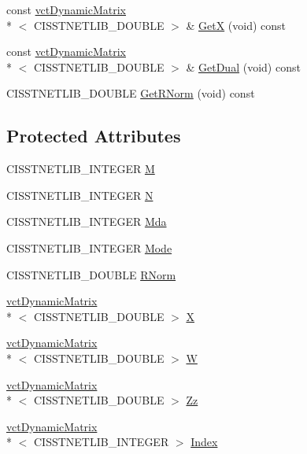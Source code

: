 \begin{DoxyCompactItemize}
\item 
const \hyperlink{classvct_dynamic_matrix}{vct\-Dynamic\-Matrix}\\*
$<$ C\-I\-S\-S\-T\-N\-E\-T\-L\-I\-B\-\_\-\-D\-O\-U\-B\-L\-E $>$ \& \hyperlink{classnmr_n_n_l_s_solver_abb01b6e1c320189b9b17ca6c88078879}{Get\-X} (void) const 
\item 
const \hyperlink{classvct_dynamic_matrix}{vct\-Dynamic\-Matrix}\\*
$<$ C\-I\-S\-S\-T\-N\-E\-T\-L\-I\-B\-\_\-\-D\-O\-U\-B\-L\-E $>$ \& \hyperlink{classnmr_n_n_l_s_solver_a74640511b0a73435a1b154afcf4fae35}{Get\-Dual} (void) const 
\item 
C\-I\-S\-S\-T\-N\-E\-T\-L\-I\-B\-\_\-\-D\-O\-U\-B\-L\-E \hyperlink{classnmr_n_n_l_s_solver_aab90d2c601668a1ce46c17761b3135a0}{Get\-R\-Norm} (void) const 
\end{DoxyCompactItemize}
\subsection*{Protected Attributes}
\begin{DoxyCompactItemize}
\item 
C\-I\-S\-S\-T\-N\-E\-T\-L\-I\-B\-\_\-\-I\-N\-T\-E\-G\-E\-R \hyperlink{classnmr_n_n_l_s_solver_a162e5dd1f43365b957bb2ba090cb0195}{M}
\item 
C\-I\-S\-S\-T\-N\-E\-T\-L\-I\-B\-\_\-\-I\-N\-T\-E\-G\-E\-R \hyperlink{classnmr_n_n_l_s_solver_a4a8548f915d678551e3b45a1e0243d24}{N}
\item 
C\-I\-S\-S\-T\-N\-E\-T\-L\-I\-B\-\_\-\-I\-N\-T\-E\-G\-E\-R \hyperlink{classnmr_n_n_l_s_solver_a11885a66db967a587d588df43f31747a}{Mda}
\item 
C\-I\-S\-S\-T\-N\-E\-T\-L\-I\-B\-\_\-\-I\-N\-T\-E\-G\-E\-R \hyperlink{classnmr_n_n_l_s_solver_a7f2d0fc2f14c7a924a05df0c4b58afb3}{Mode}
\item 
C\-I\-S\-S\-T\-N\-E\-T\-L\-I\-B\-\_\-\-D\-O\-U\-B\-L\-E \hyperlink{classnmr_n_n_l_s_solver_a5987a1e7bc38cc749adee70d6dfd1ea2}{R\-Norm}
\item 
\hyperlink{classvct_dynamic_matrix}{vct\-Dynamic\-Matrix}\\*
$<$ C\-I\-S\-S\-T\-N\-E\-T\-L\-I\-B\-\_\-\-D\-O\-U\-B\-L\-E $>$ \hyperlink{classnmr_n_n_l_s_solver_af7ff95aeea4da8d86ac0fd4bc9a220b4}{X}
\item 
\hyperlink{classvct_dynamic_matrix}{vct\-Dynamic\-Matrix}\\*
$<$ C\-I\-S\-S\-T\-N\-E\-T\-L\-I\-B\-\_\-\-D\-O\-U\-B\-L\-E $>$ \hyperlink{classnmr_n_n_l_s_solver_ac107b32faf4f947d4267ad1ae66a76d2}{W}
\item 
\hyperlink{classvct_dynamic_matrix}{vct\-Dynamic\-Matrix}\\*
$<$ C\-I\-S\-S\-T\-N\-E\-T\-L\-I\-B\-\_\-\-D\-O\-U\-B\-L\-E $>$ \hyperlink{classnmr_n_n_l_s_solver_ad4d4544b5db001588a0b9742a0b93abc}{Zz}
\item 
\hyperlink{classvct_dynamic_matrix}{vct\-Dynamic\-Matrix}\\*
$<$ C\-I\-S\-S\-T\-N\-E\-T\-L\-I\-B\-\_\-\-I\-N\-T\-E\-G\-E\-R $>$ \hyperlink{classnmr_n_n_l_s_solver_a8a75f7f12aceebd264f973684ce1b683}{Index}
\end{DoxyCompactItemize}


